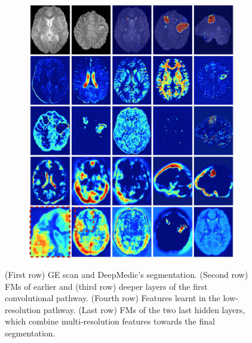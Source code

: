 
\begin{figure}[!h]
\vspace{-20pt}
\centering
\begin{subfigure}[b]{0.95\textwidth}
	\centering
	\includegraphics[clip=true, trim=0pt 0pt 0pt 0pt, width=1.0\textwidth]{figures/discussion/featureMapsFigure.png}
\end{subfigure}
\vspace{-5pt} %
\caption{(First row) GE scan and DeepMedic's segmentation. (Second row) FMs of earlier and (third row) deeper layers of the first convolutional pathway. (Fourth row) Features learnt in the low-resolution pathway. (Last row) FMs of the two last hidden layers, which combine multi-resolution features towards the final segmentation.}
\label{fig:featureMaps}
\end{figure}

